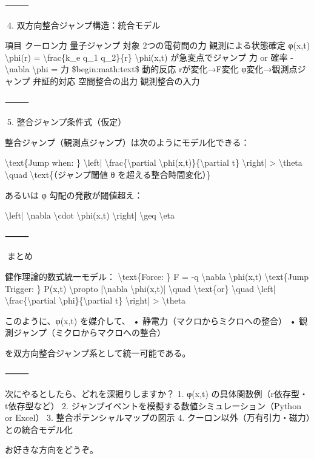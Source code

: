 \documentclass{article}
\begin{document}
⸻ 

🔹4. 双方向整合ジャンプ構造：統合モデル 

項目 クーロン力 量子ジャンプ 
対象 2つの電荷間の力 観測による状態確定 
φ(x,t) \textbackslash{}phi(r) = \textbackslash{}frac\{k\_e q\_1 q\_2\}\{r\} \textbackslash{}phi(x,t) が急変点でジャンプ 
力 or 確率 -\textbackslash{}nabla \textbackslash{}phi = 力 \$begin:math:text\$ 
動的反応 rが変化→F変化 φ変化→観測点ジャンプ 
弁証的対応 空間整合の出力 観測整合の入力 


⸻ 

🔹5. 整合ジャンプ条件式（仮定） 

整合ジャンプ（観測点ジャンプ）は次のようにモデル化できる： 

\textbackslash{}text\{Jump when: \} \textbackslash{}left| \textbackslash{}frac\{\textbackslash{}partial \textbackslash{}phi(x,t)\}\{\textbackslash{}partial t\} \textbackslash{}right| > \textbackslash{}theta 
\textbackslash{}quad \textbackslash{}text\{（ジャンプ閾値 θ を超える整合時間変化）\} 

あるいは φ 勾配の発散が閾値超え： 

\textbackslash{}left| \textbackslash{}nabla \textbackslash{}cdot \textbackslash{}phi(x,t) \textbackslash{}right| \textbackslash{}geq \textbackslash{}eta 

⸻ 

🧩まとめ 

健作理論的数式統一モデル： 
\textbackslash{}text\{Force: \} F = -q \textbackslash{}nabla \textbackslash{}phi(x,t) 
\textbackslash{}text\{Jump Trigger: \} P(x,t) \textbackslash{}propto |\textbackslash{}nabla \textbackslash{}phi(x,t)| 
\textbackslash{}quad \textbackslash{}text\{or\} \textbackslash{}quad \textbackslash{}left| \textbackslash{}frac\{\textbackslash{}partial \textbackslash{}phi\}\{\textbackslash{}partial t\} \textbackslash{}right| > \textbackslash{}theta 

このように、φ(x,t) を媒介して、 
• 静電力（マクロからミクロへの整合） 
• 観測ジャンプ（ミクロからマクロへの整合） 

を双方向整合ジャンプ系として統一可能である。 

⸻ 

次にやるとしたら、どれを深掘りしますか？ 
1. φ(x,t) の具体関数例（r依存型・t依存型など） 
2. ジャンプイベントを模擬する数値シミュレーション（Python or Excel） 
3. 整合ポテンシャルマップの図示 
4. クーロン以外（万有引力・磁力）との統合モデル化 

お好きな方向をどうぞ。
\end{document}
